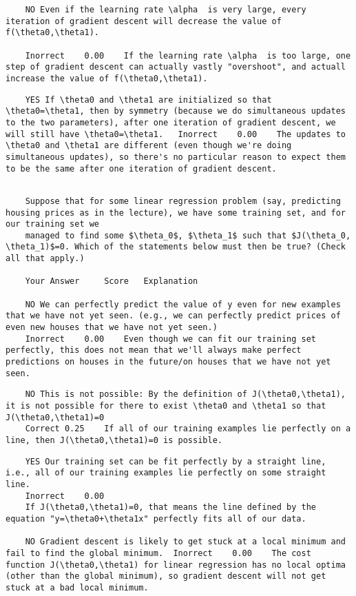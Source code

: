 \documentclass[11pt]{article} %
\begin{document}
	\begin{verbatim}
	NO Even if the learning rate \alpha  is very large, every iteration of gradient descent will decrease the value of f(\theta0,\theta1).	
	
	Inorrect	0.00	If the learning rate \alpha  is too large, one step of gradient descent can actually vastly "overshoot", and actuall increase the value of f(\theta0,\theta1).
	\end{verbatim}
	
	\begin{verbatim}
	YES If \theta0 and \theta1 are initialized so that \theta0=\theta1, then by symmetry (because we do simultaneous updates to the two parameters), after one iteration of gradient descent, we will still have \theta0=\theta1.	Inorrect	0.00	The updates to \theta0 and \theta1 are different (even though we're doing simultaneous updates), so there's no particular reason to expect them to be the same after one iteration of gradient descent.
	\end{verbatim}
	
	\begin{verbatim}
	
	Suppose that for some linear regression problem (say, predicting housing prices as in the lecture), we have some training set, and for our training set we 
	managed to find some $\theta_0$, $\theta_1$ such that $J(\theta_0, \theta_1)$=0. Which of the statements below must then be true? (Check all that apply.)
	
	Your Answer		Score	Explanation
	
	NO We can perfectly predict the value of y even for new examples that we have not yet seen. (e.g., we can perfectly predict prices of even new houses that we have not yet seen.)	
	Inorrect	0.00	Even though we can fit our training set perfectly, this does not mean that we'll always make perfect predictions on houses in the future/on houses that we have not yet seen.
	\end{verbatim}
	
	\begin{verbatim}
	NO This is not possible: By the definition of J(\theta0,\theta1), it is not possible for there to exist \theta0 and \theta1 so that J(\theta0,\theta1)=0	
	Correct	0.25	If all of our training examples lie perfectly on a line, then J(\theta0,\theta1)=0 is possible.
	\end{verbatim}
	
	\begin{verbatim}
	YES Our training set can be fit perfectly by a straight line, i.e., all of our training examples lie perfectly on some straight line.	
	Inorrect	0.00	
	If J(\theta0,\theta1)=0, that means the line defined by the equation "y=\theta0+\theta1x" perfectly fits all of our data.
	
	NO Gradient descent is likely to get stuck at a local minimum and fail to find the global minimum.	Inorrect	0.00	The cost function J(\theta0,\theta1) for linear regression has no local optima (other than the global minimum), so gradient descent will not get stuck at a bad local minimum.
	\end{verbatim}
	
\end{document}
